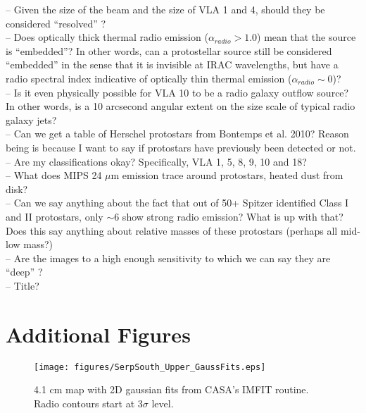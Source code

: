 \documentclass[apj]{emulateapj}
\begin{document}
-- Given the size of the beam and the size of VLA 1 and 4, should they be considered ``resolved'' ? \\

-- Does optically thick thermal radio emission ($\alpha_{radio} > 1.0$) mean that the source is ``embedded''? In other words, can a protostellar source still be considered ``embedded'' in the sense that it is invisible at IRAC wavelengths, but have a radio spectral index indicative of optically thin thermal emission ($\alpha_{radio} \sim0$)?\\

-- Is it even physically possible for VLA 10 to be a radio galaxy outflow source? In other words, is a 10 arcsecond angular extent on the size scale of typical radio galaxy jets? \\

-- Can we get a table of Herschel protostars from Bontemps et al. 2010? Reason being is because I want to say if protostars have previously been detected or not.\\

-- Are my classifications okay? Specifically, VLA 1, 5, 8, 9, 10 and 18? \\

-- What does MIPS 24 $\mu$m emission trace around protostars, heated dust from disk?\\

-- Can we say anything about the fact that out of 50+ Spitzer identified Class I and II protostars, only $\sim$6 show strong radio emission? What is up with that? Does this say anything about relative masses of these protostars (perhaps all mid-low mass?) \\

-- Are the images to a high enough sensitivity to which we can say they are ``deep'' ? \\

-- Title? \\


\newpage
\section{Additional Figures}

\begin{figure}[h!]
\label{fig:serpsouth_upper_gaussfits}
\centering
\texttt{[image: figures/SerpSouth\_Upper\_GaussFits.eps]}
\caption{\small{4.1 cm map with 2D gaussian fits from CASA's IMFIT routine. Radio contours start at 3$\sigma$ level.
}}
\end{figure}
\end{document}
